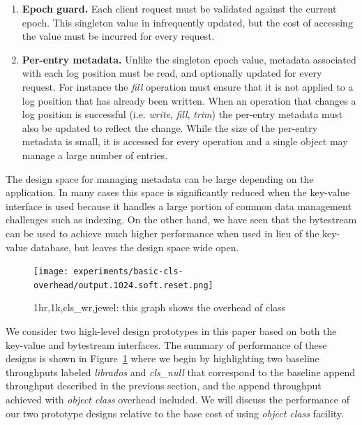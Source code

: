 \documentclass[10pt,twocolumn]{article}
\begin{document}
\begin{enumerate}
    \item {\bf Epoch guard.} Each client request must be validated against the
        current epoch. This singleton value in infrequently updated, but the
        cost of accessing the value must be incurred for every request.

    \item {\bf Per-entry metadata.} Unlike the singleton epoch value, metadata
        associated with each log position must be read, and optionally updated
        for every request. For instance the \emph{fill} operation must ensure
        that it is not applied to a log position that has already been
        written. When an operation that changes a log position is successful
        (i.e. \emph{write}, \emph{fill}, \emph{trim}) the per-entry metadata
        must also be updated to reflect the change. While the size of the
        per-entry metadata is small, it is accessed for every operation and a
        single object may manage a large number of entries.
\end{enumerate}

The design space for managing metadata can be large depending on the
application. In many cases this space is significantly reduced when the
key-value interface is used because it handles a large portion of common data
management challenges such as indexing. On the other hand, we have seen that
the bytestream can be used to achieve much higher performance when used in
lieu of the key-value database, but leaves the design space wide open.

\begin{figure}[t]
	\centering
	\texttt{[image: experiments/basic-cls-overhead/output.1024.soft.reset.png]}
	\caption{1hr,1k,cls\_wr,jewel: this graph shows the overhead of class}
	\label{fig:cls_wr_jewel}
\end{figure}

We consider two high-level design prototypes in this paper based on both the
key-value and bytestream interfaces. The summary of performance of these
designs is shown in Figure~\ref{fig:cls_wr_jewel} where we begin by
highlighting two baseline throughputs labeled \emph{librados} and
\emph{cls\_null} that correspond to the baseline append throughput described
in the previous section, and the append throughput achieved with \emph{object
class} overhead included. We will discuss the performance of our two prototype
designs relative to the base cost of using \emph{object class} facility.
\end{document}
